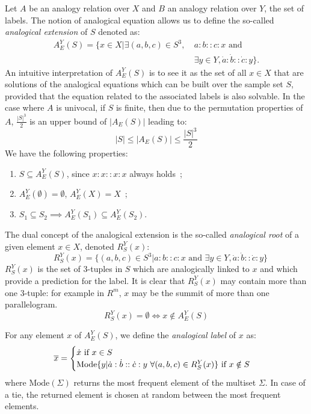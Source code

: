 Let $A$ be an analogy relation over $X$ and $B$ an analogy relation over $Y$, the set of labels.
The notion of analogical equation allows us to define the so-called {\it
analogical extension} of $S$ denoted as:
\begin{align*}
  A_E^Y(S)=\{ x \in X | \exists (a,b,c) \in S^3, ~ & a:b::c:x \mbox{ and }\\
& \exists y \in Y, \dot{a}:\dot{b}::\dot{c}:y\}.
\end{align*}
An intuitive interpretation of $A_E^Y(S)$ is to see it as the set of all $x \in
X$ that are solutions of the analogical equations which can be built over the
sample set $S$, provided that the equation related to the associated labels is also solvable.
In the case where $A$ is univocal, if $S$ is finite, then due to the
permutation properties of $A$, $\frac{|S|^3}{2}$ is an upper bound of
$|A_E(S)|$ leading to: $$|S| \leq |A_E(S)| \leq \frac{|S|^3}{2}$$
We have the following properties:
\begin{enumerate}
\item $S \subseteq A_E^Y(S)$, since $x:x::x:x$ always holds~;
\item$A_E^Y(\emptyset)=\emptyset$, $A_E^Y(X)=X$~;
\item $S_1 \subseteq S_2 \implies A_E^Y(S_1) \subseteq A_E^Y(S_2)$.
\end{enumerate}

The dual concept of the analogical extension is the so-called {\it analogical
root} of a given element $x \in X$, denoted $R_{S}^Y(x)$:
$$\quad R_{S}^Y(x) = \{(a, b, c) \in S^3 | a:b::c:x \mbox{ and } \exists
y \in Y, \dot{a}:\dot{b}::\dot{c}:y\}$$
$R_{S}^Y(x)$ is the set of 3-tuples in $S$ which are analogically linked to
$x$ and which provide a prediction for the label. It is clear that $R_{S}^Y(x)$ may contain more than one 3-tuple: for
example in $R^m$, $x$ may be the summit of more than one parallelogram.
$$R_{S}^Y(x) = \emptyset \iff x \notin A_E^Y(S)$$

For any element $x$ of $A_E^Y(S)$, we define the \textit{analogical label} of
$x$ as:
$$\overline{x} = \begin{cases}
\dot{x} \text{ if } x \in S\\
\text{Mode} \{y | \dot{a} : \dot{b} :: \dot{c} : y ~ \forall (a, b, c) \in
R_S^Y(x) \} \text{ if } x \notin S
\end{cases}
$$
where $\text{Mode}(\Sigma)$ returns the most frequent element of the multiset
$\Sigma$. In case of a tie, the returned element is chosen at random between
the most frequent elements.

